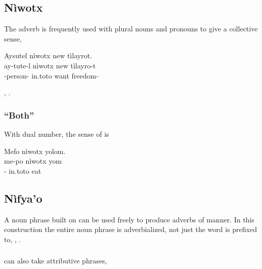 \subsection{Nìwotx} The adverb   is frequently used with plural nouns and pronouns to
give a collective sense,

\begin{interlin}
\glll Aysutel nìwotx new tìlayrot. \\
     ay-tute-l nìwotx new tìlayro-t \\
    -person- in.toto want freedom- \\
 \Ipawl{}
\end{interlin}

\noindent{} ,  .

\subsubsection{``Both''} With dual number, the sense of  is

\begin{interlin}
\glll Mefo nìwotx yolom. \\
      me-po nìwotx yom \\
      - in.toto eat \\
\end{interlin}

\subsection{Nìfya'o} A noun phrase built on  can be used
freely to produce adverbs of manner.  In this construction the entire
noun phrase is adverbialized, not just the word  is prefixed
to,  , 
.
\label{syn:nifyao}

\subsubsection{}  can also take attributive phrases,
 

